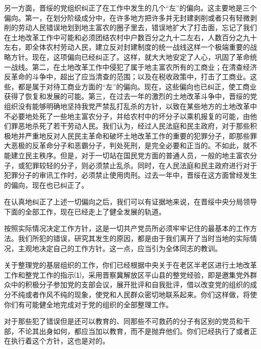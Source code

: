 \documentclass[UTF-8, a5paper, 12pt]{ctexart}
\begin{document}
另一方面，晋绥的党组织纠正了在工作中发生的几个“左”的偏向。这主要地是三个偏向。第一，在划分阶级成分中，在许多地方把许多并无封建剥削或者只有轻微剥削的劳动人民错误地划到地主富农的圈子里去，错误地扩大了打击面，忘记了我们在土地改革工作中可能和必须团结农村中户数百分之九十二左右，人数百分之九十左右，即全体农村劳动人民，建立反对封建制度的统一战线这样一个极端重要的战略方针。现在，这项偏向已经纠正了。这样，就大大地安定了人心，巩固了革命统一战线。第二，在土地改革工作中侵犯了属于地主富农所有的工商业；在清查经济反革命的斗争中，超出了应当清查的范围；以及在税收政策中，打击了工商业。这些，都是属于对待工商业方面的“左”的偏向。现在，这些偏向也已纠正，使工商业获得了恢复和发展的可能。第三，在过去一年的激烈的土地改革斗争中，晋绥的党组织没有能够明确地坚持我党严禁乱打乱杀的方针，以致在某些地方的土地改革中不必要地处死了一些地主富农分子，并给农村中的坏分子以乘机报复的可能，由他们罪恶地杀死了若干劳动人民。我们认为，经过人民法庭和民主政府，对于那些积极地并严重地反对人民民主革命和破坏土地改革工作的重要的犯罪分子，即那些罪大恶极的反革命分子和恶霸分子，判处死刑，是完全必要和正当的。不如此，就不能建立民主秩序。但是，对于一切站在国民党方面的普通人员，一般的地主富农分子，或犯罪较轻的分子，则必须禁止乱杀。同时，在人民法庭和民主政府进行对于犯罪分子的审讯工作时，必须禁止使用肉刑。过去一年中，晋绥在这方面曾经发生的偏向，现在也已纠正了。

在认真地纠正了上述一切偏向之后，我们可以有证据地来说，在晋绥中央分局领导下面的全部工作，现在已经走上了健全发展的轨道。

按照实际情况决定工作方针，这是一切共产党员所必须牢牢记住的最基本的工作方法。我们所犯的错误，研究其发生的原因，都是由于我们离开了当时当地的实际情况，主观地决定自己的工作方针。这一点，应当引为全体同志的教训。

关于整理党的基层组织的工作，你们已经根据中央关于在老区半老区进行土地改革工作和整党工作的指示⑴，采用晋察冀解放区平山县的整党经验，即是邀集党外群众中的积极分子参加党的支部会议，展开批评和自我批评，借以改变党的组织的成分不纯或者作风不纯的现象，使党和人民群众密切地联系起来。你们这样做，将使你们有可能健全地完成对于党的组织的全部整理工作。

对于那些犯了错误但是还可以教育的、同那些不可救药的分子有区别的党员和干部，不论其出身如何，都应当加以教育，而不是抛弃他们。你们已经执行了或者正在执行着这个方针，这也是对的。
\end{document}
